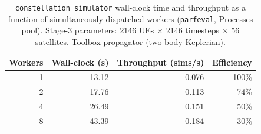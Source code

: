 \begin{table}[H]
    \centering
    \caption{\texttt{constellation\_simulator} wall-clock time and throughput as a function
             of simultaneously dispatched workers (\texttt{parfeval}, Processes pool).
             Stage-3 parameters: 2146 \acp{UE} $\times$ 2146 timesteps $\times$ 56 satellites.
             Toolbox propagator (two-body-Keplerian).}
    \label{tab:worker_scaling}
    \begin{tabular}{r r r r}
        \toprule
        \textbf{Workers} & \textbf{Wall-clock (s)} & \textbf{Throughput (sims/s)} & \textbf{Efficiency} \\
        \midrule
         1 & 13.12 & 0.076 & 100\% \\
         2 & 17.76 & 0.113 & 74\% \\
         4 & 26.49 & 0.151 & 50\% \\
         8 & 43.39 & 0.184 & 30\% \\
        \bottomrule
    \end{tabular}
\end{table}
